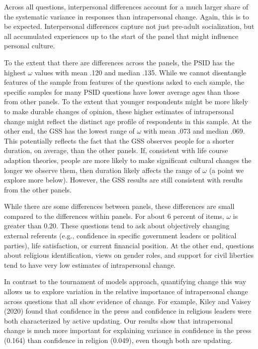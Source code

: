 \documentclass[
  12pt,
]{article}
\begin{document}
Across all questions, interpersonal differences account for a much
larger share of the systematic variance in responses than intrapersonal
change. Again, this is to be expected. Interpersonal differences capture
not just pre-adult socialization, but all accumulated experiences up to
the start of the panel that might influence personal culture.

To the extent that there are differences across the panels, the PSID has
the highest \(\omega\) values with mean .120 and median .135. While we
cannot disentangle features of the sample from features of the questions
asked to each sample, the specific samples for many PSID questions have
lower average ages than those from other panels. To the extent that
younger respondents might be more likely to make durable changes of
opinion, these higher estimates of intrapersonal change might reflect
the distinct age profile of respondents in this sample. At the other
end, the GSS has the lowest range of \(\omega\) with mean .073 and
median .069. This potentially reflects the fact that the GSS observes
people for a shorter duration, on average, than the other panels. If,
consistent with life course adaption theories, people are more likely to
make significant cultural changes the longer we observe them, then
duration likely affects the range of \(\omega\) (a point we explore more
below). However, the GSS results are still consistent with results from
the other panels.

While there are some differences between panels, these differences are
small compared to the differences within panels. For about 6 percent of
items, \(\omega\) is greater than 0.20. These questions tend to ask
about objectively changing external referents (e.g., confidence in
specific government leaders or political parties), life satisfaction, or
current financial position. At the other end, questions about religious
identification, views on gender roles, and support for civil liberties
tend to have very low estimates of intrapersonal change.

In contrast to the tournament of models approach, quantifying change
this way allows us to explore variation in the relative importance of
intrapersonal change across questions that all show evidence of change.
For example, Kiley and Vaisey (2020) found that confidence in the press
and confidence in religious leaders were both characterized by active
updating. Our results show that intrapersonal change is much more
important for explaining variance in confidence in the press (0.164)
than confidence in religion (0.049), even though both are updating.
\end{document}
